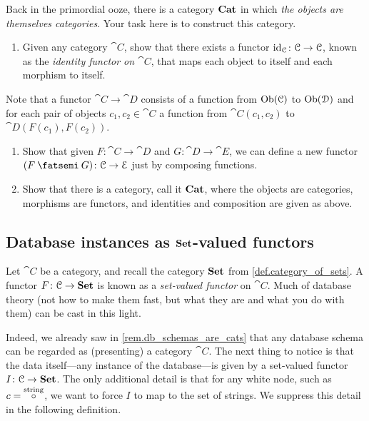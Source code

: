 \documentclass[7Sketches]{subfiles}
\begin{document}
\begin{exercise}%
\label{exc.cat_of_cats}%
%
%
%
Back in the primordial ooze, there is a category $\Cat{Cat}$ in which \emph{the
objects are themselves categories}. Your task here is to construct this
category.
\begin{enumerate}
  \item Given any category $\cat{C}$, show that there exists a functor $\id_{\cat{C}}\colon
  \cat{C} \to \cat{C}$, known as the \emph{identity functor on $\cat{C}$}, that
  maps each object to itself and each morphism to itself.
\end{enumerate}
Note that a functor $\cat{C} \to \cat{D}$ consists of a function from $\Ob(\cat{C})$ to $\Ob(\cat{D})$ and for each pair of objects $c_1,c_2 \in \cat{C}$ a function from $\cat{C}(c_1,c_2)$ to $\cat{D}(F(c_1),F(c_2))$. 
\begin{enumerate}[resume]
  \item Show that given
  $F\colon \cat{C} \to \cat{D}$ and $G\colon \cat{D} \to \cat{E}$, we can define a
  new functor $(F\cp G)\colon \cat{C} \to \cat{E}$ just by composing functions. 
  \item Show that there is a category, call it $\Cat{Cat}$, where the objects are categories, morphisms
  are functors, and identities and composition are given as above.
  \qedhere
\end{enumerate}
\end{exercise}

%

\subsection{Database instances as $\smset$-valued functors}%


Let $\cat{C}$ be a category, and recall the category $\smset$ from \cref{def.category_of_sets}. A functor $F\colon\cat{C}\to\smset$ is known as a \emph{set-valued functor} on $\cat{C}$. Much of database theory (not how to make them fast, but what they are and what you do with them) can be cast in this light.

Indeed, we already saw in \cref{rem.db_schemas_are_cats} that any database schema can be regarded as (presenting) a 
category $\cat{C}$. The next thing to notice is that the data itself---any
instance of the database---is given by a set-valued functor
$I\colon\cat{C}\to\smset$. The only additional detail is that for any white
node, such as $c=\LTO[\circ]{string}$, we want to force $I$ to map to the set of
strings. We suppress this detail in the following definition.
\end{document}
